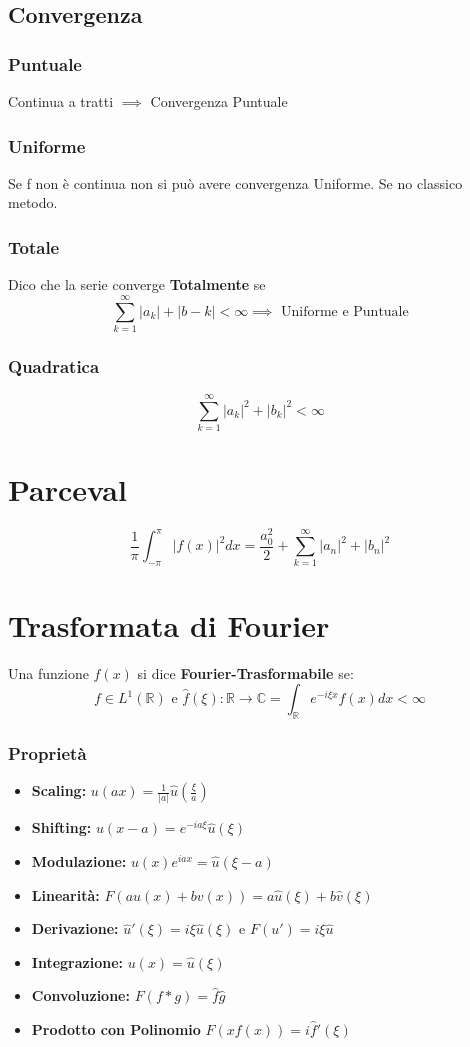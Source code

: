 \documentclass[a4paper,notitlepage]{report}%
\newcommand{\C}{\mathbb{C}}
\newcommand{\R}{\mathbb{R}}%
\begin{document}
\begin{multicols*}{2}
\subsection*{Convergenza}

\subsubsection*{Puntuale}
Continua a tratti $\implies$ Convergenza Puntuale
\subsubsection*{Uniforme}
Se f non è continua non si può avere convergenza Uniforme. Se no classico metodo.
\subsubsection*{Totale}
Dico che la serie converge \textbf{Totalmente} se
\[
    \sum_{k=1}^\infty |a_k|+|b-k|<\infty \implies \text{ Uniforme e Puntuale}
\]

\subsubsection*{Quadratica}
\[
    \sum_{k=1}^\infty  |a_k|^2+|b_k|^2 < \infty
\]


\section*{Parceval}
\[
   \frac{1}{\pi} \int_{-\pi}^\pi |f(x)|^2dx = \frac{a^2_0}{2} + \sum_{k=1}^\infty |a_n|^2 + |b_n|^2     
\]


\section*{Trasformata di Fourier}
Una funzione $f(x)$ si dice \textbf{Fourier-Trasformabile} se:\[
    f\in L^1(\R) \text{ e } \hat{f}(\xi):\R\to\C = \int_\R e^{-i\xi x}f(x) dx<\infty
\]
\subsubsection*{Proprietà}
\begin{itemize}
    \item \textbf{Scaling:} $u(ax) = \frac{1}{ |a| }\hat{u}(\frac{\xi}{a})$
    \item \textbf{Shifting:} $u(x-a) = e^{-ia\xi}\hat{u}(\xi)$
    \item \textbf{Modulazione:} $u(x)e^{iax} = \hat{u}(\xi-a)$
    \item \textbf{Linearità:} $F(au(x)+bv(x)) = a\hat{u}(\xi)+b\hat{v}(\xi)$
    \item \textbf{Derivazione:} $\hat{u}'(\xi) = i\xi\hat{u}(\xi)$ e $F(u')=i\xi\hat{u}$
    \item \textbf{Integrazione:} $u(x) = \hat{u}(\xi)$
    \item \textbf{Convoluzione: } $F(f*g)=\hat{f}\hat{g}$
    \item \textbf{Prodotto con Polinomio} $F(xf(x))=i\hat{f}'(\xi)$
\end{itemize}

\end{multicols*}
\end{document}
